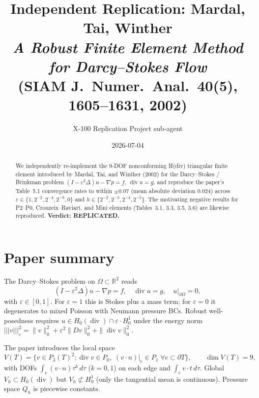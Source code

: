 \documentclass[11pt]{article}
\title{Independent Replication: Mardal, Tai, Winther \\
       \emph{A Robust Finite Element Method for Darcy--Stokes Flow} \\
       (SIAM J.\ Numer.\ Anal.\ 40(5), 1605--1631, 2002)}
\author{X-100 Replication Project sub-agent}
\date{2026-07-04}
\begin{document}
\maketitle

\begin{abstract}
We independently re-implement the 9-DOF nonconforming H(div) triangular
finite element introduced by Mardal, Tai, and Winther (2002) for the
Darcy--Stokes / Brinkman problem
$(I-\varepsilon^2\Delta)u-\nabla p = f$, $\operatorname{div} u = g$,
and reproduce the paper's Table~5.1 convergence rates to within
$\pm 0.07$ (mean absolute deviation $0.024$) across
$\varepsilon\in\{1,2^{-2},2^{-4},2^{-8},0\}$ and
$h\in\{2^{-2},2^{-3},2^{-4},2^{-5}\}$.  The motivating
negative results for P2--P0, Crouzeix--Raviart, and Mini elements
(Tables~3.1, 3.3, 3.5, 3.6) are likewise reproduced.  \textbf{Verdict:
REPLICATED.}
\end{abstract}

\section{Paper summary}
The Darcy--Stokes problem on $\Omega\subset\mathbb{R}^2$ reads
\begin{equation}
    (I-\varepsilon^2\Delta)u-\nabla p = f,\quad
    \operatorname{div} u = g,\quad u|_{\partial\Omega}=0,
\end{equation}
with $\varepsilon\in[0,1]$.  For $\varepsilon=1$ this is Stokes plus a
mass term; for $\varepsilon=0$ it degenerates to mixed Poisson with
Neumann pressure BCs.  Robust well-posedness requires
$u\in H_0(\operatorname{div})\cap\varepsilon\cdot H^1_0$ under the
energy norm
$|||v|||^2_\varepsilon = \|v\|_0^2+\varepsilon^2\|Dv\|_0^2+\|\operatorname{div} v\|_0^2$.

The paper introduces the local space
\[
V(T)=\{v\in P_3(T)^2 : \operatorname{div} v\in P_0,\;
(v\cdot n)|_e\in P_1\;\forall e\subset\partial T\},\qquad
\dim V(T)=9,
\]
with DOFs $\int_e (v\cdot n)\tau^k\,d\tau$ ($k=0,1$) on each edge and
$\int_e v\cdot t\,d\tau$.  Global $V_h\subset H_0(\operatorname{div})$
but $V_h\not\subset H^1_0$ (only the tangential mean is continuous).
Pressure space $Q_h$ is piecewise constants.
\end{document}
